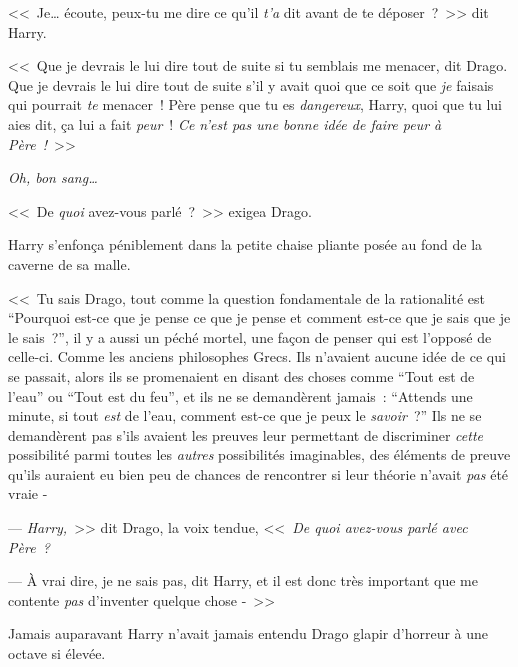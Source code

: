 <<~Je… écoute, peux-tu me dire ce qu'il \emph{t'a} dit avant de te déposer~?~>> dit Harry.

<<~Que je devrais le lui dire tout de suite si tu semblais me menacer, dit Drago. Que je devrais le lui dire tout de suite s'il y avait quoi que ce soit que \emph{je} faisais qui pourrait \emph{te} menacer~! Père pense que tu es \emph{dangereux}, Harry, quoi que tu lui aies dit, ça lui a fait \emph{peur}~! \emph{Ce n'est pas une bonne idée de faire peur à Père~!}~>>

\emph{Oh, bon sang…}

<<~De \emph{quoi} avez-vous parlé~?~>> exigea Drago.

Harry s'enfonça péniblement dans la petite chaise pliante posée au fond de la caverne de sa malle.

<<~Tu sais Drago, tout comme la question fondamentale de la rationalité est “Pourquoi est-ce que je pense ce que je pense et comment est-ce que je sais que je le sais~?”, il y a aussi un péché mortel, une façon de penser qui est l'opposé de celle-ci. Comme les anciens philosophes Grecs. Ils n'avaient aucune idée de ce qui se passait, alors ils se promenaient en disant des choses comme “Tout est de l'eau” ou “Tout est du feu”, et ils ne se demandèrent jamais~: “Attends une minute, si tout \emph{est} de l'eau, comment est-ce que je peux le \emph{savoir}~?” Ils ne se demandèrent pas s'ils avaient les preuves leur permettant de discriminer \emph{cette} possibilité parmi toutes les \emph{autres} possibilités imaginables, des éléments de preuve qu'ils auraient eu bien peu de chances de rencontrer si leur théorie n'avait \emph{pas} été vraie -

--- \emph{Harry,}~>> dit Drago, la voix tendue, <<~\emph{De quoi avez-vous parlé avec Père~?}

--- À vrai dire, je ne sais pas, dit Harry, et il est donc très important que me contente \emph{pas} d'inventer quelque chose -~>>

Jamais auparavant Harry n'avait jamais entendu Drago glapir d'horreur à une octave si élevée.

